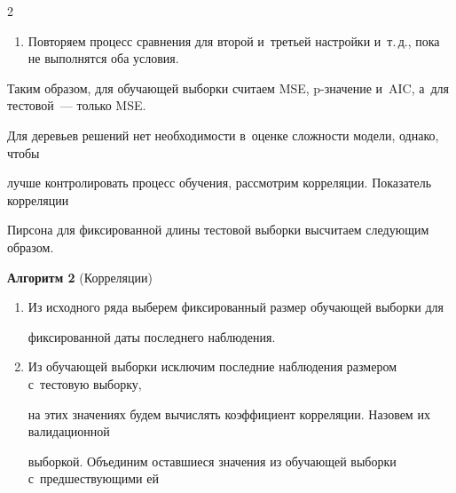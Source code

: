 \begin{multicols}{2}
\begin{enumerate}[1.]
        то переходим к~сле\-ду\-юще\-му шагу. Иначе выбираем настройку с~минимальным AIC.

        

        \item

        

        Повторяем процесс сравнения для второй и~трет\-ьей настройки и~т.\,д., пока не выполнятся оба условия.

        \end{enumerate}



\noindent

Таким образом, для обучающей выборки считаем MSE, p-зна\-че\-ние и~AIC, а~для тестовой~--- только MSE.

Для деревьев решений нет необходимости в~оценке сложности модели, однако, чтобы 

лучше контролировать процесс обучения, рассмотрим корреляции. Показатель корреляции 

Пирсона для фиксированной длины тестовой выборки высчитаем сле\-ду\-ющим образом.



\vspace*{2pt}



\textbf{Алгоритм 2} (Корреляции) %

    

        \noindent

        \begin{enumerate}[1.]

        

        \item

        Из исходного ряда выберем фиксированный размер обучающей выборки для 

        фиксированной даты последнего наблюдения.



        

        \item

        Из обучающей выборки исключим последние наблюдения размером с~тестовую выборку, 

        на этих значениях будем вычислять коэффициент корреляции. Назовем их валидационной 

        выборкой. Объединим оставшиеся значения из обучающей выборки с~предшествующими ей 


\end{enumerate}
\end{multicols}
